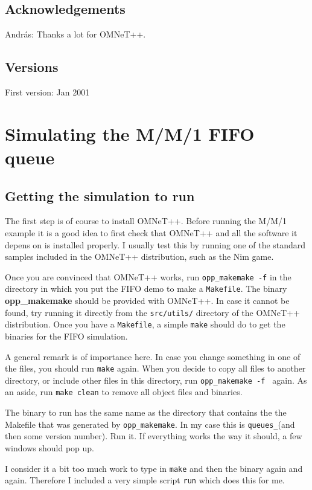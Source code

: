 \documentclass[a4paper]{article}
\begin{document}
\subsection{Acknowledgements}
\label{sec:acknowledgements}
Andr{\'a}s: Thanks a lot for OMNeT++.


\subsection{Versions}
\noindent First version: Jan 2001

\section{Simulating the M/M/1 FIFO queue}
\label{sec:simulating-mm1-fifo}

\subsection{Getting the simulation to run}
\label{sec:getting-it-running}
The first step is of course to install OMNeT++. Before running the
M/M/1 example it is a good idea to first check that OMNeT++ and all
the software it depens on is installed properly. I usually test this
by running one of the standard samples included in the OMNeT++
distribution, such as the Nim game.

Once you are convinced that OMNeT++ works, run \texttt{opp_makemake -f} in
the directory in which you put the FIFO demo to make a
\texttt{Makefile}. The binary \textbf{opp_makemake} should be provided with OMNeT++.
In case it cannot be found, try running it directly from the
\texttt{src/utils/} directory of the OMNeT++ distribution. Once you
have a \texttt{Makefile}, a simple \texttt{make} should do to get the
binaries for the FIFO simulation.

A general remark is of importance here. In case you change something in one
of the files, you should run \texttt{make} again. When you decide to
copy all files to another directory, or include other files in this
directory, run \texttt{opp_makemake -f } again. As an aside, run
\texttt{make clean} to remove all object files and binaries.

The binary to run has the same name as the directory that contains the
the Makefile that was generated by \texttt{opp_makemake}. In my case this
is \texttt{queues\_}(and then some version number). Run it. If
everything works the way it should, a few windows should pop up.

I consider it a bit too much work to type in \texttt{make} and then
the binary  again and again. Therefore I included a very
simple script \texttt{run} which does this for me.
\end{document}
